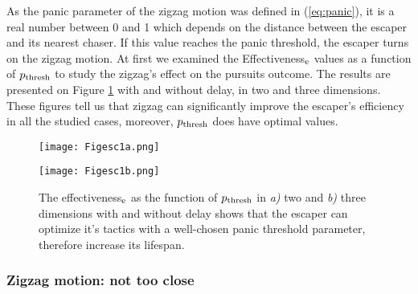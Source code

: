 \documentclass[12pt,a4paper,final]{iopart}
\begin{document}
As the panic parameter of the zigzag motion was defined in (\ref{eq:panic}), it is a real number between 0 and 1 which depends on the distance between the escaper and its nearest chaser. If this value reaches the panic threshold, the escaper turns on the zigzag motion. At first we examined the Effectiveness$_{\rm e}$ values as a function of $p_{\rm thresh}$ to study the zigzag's effect on the pursuits outcome. The results are presented on Figure \ref{fig:panicth} with and without delay, in two and three dimensions. These figures tell us that zigzag can significantly improve the escaper's efficiency in all the studied cases, moreover, $p_{\rm thresh}$ does have optimal values.

\begin{figure}[t]
\begin{minipage}[c]{0.5\textwidth}
\texttt{[image: Figesc1a.png]}
\end{minipage}
\begin{minipage}[c]{0.5\textwidth}
\texttt{[image: Figesc1b.png]}
\end{minipage}\hfill
\caption{The effectiveness$_{\rm e}$ as the function of $p_{\rm thresh}$ in {\it a)} two and {\it b)} three dimensions with and without delay shows that the escaper can optimize it's tactics with a well-chosen panic threshold parameter, therefore increase its lifespan.}
\label{fig:panicth}
\end{figure}




\subsubsection{Zigzag motion: not too close }
\end{document}
